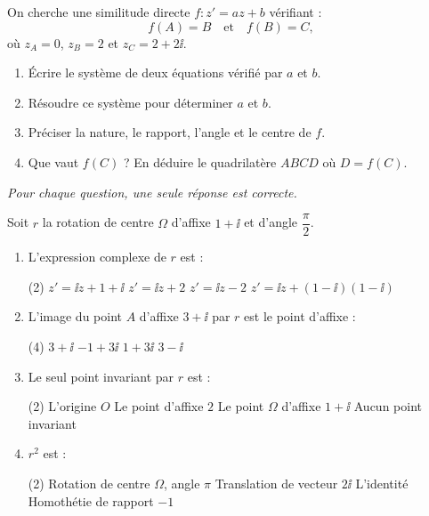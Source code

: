 
On cherche une similitude directe $f : z' = az + b$ vérifiant :
$$
f(A) = B \quad \text{et} \quad f(B) = C,
$$
où $z_A = 0$, $z_B = 2$ et $z_C = 2 + 2\ii$.

\begin{enumerate}
	\item Écrire le système de deux équations vérifié par $a$ et $b$.
	\item Résoudre ce système pour déterminer $a$ et $b$.
	\item Préciser la nature, le rapport, l'angle et le centre de $f$.
	\item Que vaut $f(C)$ ? En déduire le quadrilatère $ABCD$ où $D = f(C)$.
\end{enumerate}



\textit{Pour chaque question, une seule réponse est correcte.}

Soit $r$ la rotation de centre $\Omega$ d'affixe $1 + \ii$ et d'angle $\dfrac{\pi}{2}$.

\begin{enumerate}
	\item L'expression complexe de $r$ est :
	\begin{qcm}(2)
		\task $z' = \ii z + 1 + \ii$
		\task $z' = \ii z + 2$
		\task $z' = \ii z - 2$
		\task $z' = \ii z + (1-\ii)(1-\ii)$
	\end{qcm}

	\item L'image du point $A$ d'affixe $3 + \ii$ par $r$ est le point d'affixe :
	\begin{qcm}(4)
		\task $3 + \ii$
		\task $-1 + 3\ii$
		\task $1 + 3\ii$
		\task $3 - \ii$
	\end{qcm}

	\item Le seul point invariant par $r$ est :
	\begin{qcm}(2)
		\task L'origine $O$
		\task Le point d'affixe $2$
		\task Le point $\Omega$ d'affixe $1 + \ii$
		\task Aucun point invariant
	\end{qcm}

	\item $r^2$ est :
	\begin{qcm}(2)
		\task Rotation de centre $\Omega$, angle $\pi$
		\task Translation de vecteur $2\ii$
		\task L'identité
		\task Homothétie de rapport $-1$
	\end{qcm}
\end{enumerate}


